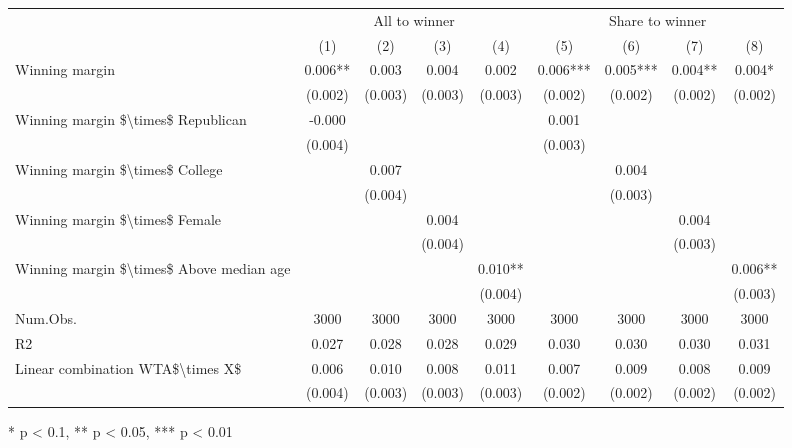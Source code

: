\begin{table}[t]
\fontsize{12.0pt}{14.4pt}\selectfont
\begin{tabular*}{\linewidth}{@{\extracolsep{\fill}}lcccccccc}
\toprule
 & \multicolumn{4}{c}{All to winner} & \multicolumn{4}{c}{Share to winner} \\ 
\cmidrule(lr){2-5} \cmidrule(lr){6-9}
  & (1) & (2) & (3) & (4) & (5) & (6) & (7) & (8) \\ 
\midrule\addlinespace[2.5pt]
Winning margin & 0.006** & 0.003 & 0.004 & 0.002 & 0.006*** & 0.005*** & 0.004** & 0.004* \\ 
 & (0.002) & (0.003) & (0.003) & (0.003) & (0.002) & (0.002) & (0.002) & (0.002) \\ 
Winning margin \$\textbackslash{}times\$ Republican & -0.000 &  &  &  & 0.001 &  &  &  \\ 
 & (0.004) &  &  &  & (0.003) &  &  &  \\ 
Winning margin \$\textbackslash{}times\$ College &  & 0.007 &  &  &  & 0.004 &  &  \\ 
 &  & (0.004) &  &  &  & (0.003) &  &  \\ 
Winning margin \$\textbackslash{}times\$ Female &  &  & 0.004 &  &  &  & 0.004 &  \\ 
 &  &  & (0.004) &  &  &  & (0.003) &  \\ 
Winning margin \$\textbackslash{}times\$ Above median age &  &  &  & 0.010** &  &  &  & 0.006** \\ 
{} & {} & {} & {} & {(0.004)} & {} & {} & {} & {(0.003)} \\ 
Num.Obs. & 3000 & 3000 & 3000 & 3000 & 3000 & 3000 & 3000 & 3000 \\ 
R2 & 0.027 & 0.028 & 0.028 & 0.029 & 0.030 & 0.030 & 0.030 & 0.031 \\ 
Linear combination WTA\$\textbackslash{}times X\$ & 0.006 & 0.010 & 0.008 & 0.011 & 0.007 & 0.009 & 0.008 & 0.009 \\ 
 & (0.004) & (0.003) & (0.003) & (0.003) & (0.002) & (0.002) & (0.002) & (0.002) \\ 
\bottomrule
\end{tabular*}
\begin{minipage}{\linewidth}
* p < 0.1, ** p < 0.05, *** p < 0.01\\
\end{minipage}
\end{table}


